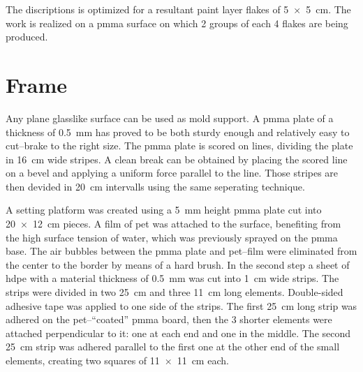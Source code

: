 \documentclass[review]{elsarticle}
\begin{document}
The discriptions is optimized for a resultant paint layer flakes of \SI[product-units = single]{5 x 5}{\cm}. The work is realized on a \gls{pmma} surface on which 2 groups of each 4 flakes are being produced.

\section{Frame}

Any plane glasslike surface can be used as mold support.
A \gls{pmma} plate of a thickness of \SI{0.5}{\mm} has proved to be both sturdy enough and relatively easy to cut--brake to the right size.
The \gls{pmma} plate is scored on lines, dividing the plate in \SI{16}{\cm} wide stripes.
A clean break can be obtained by placing the scored line on a bevel and applying a uniform force parallel to the line.
Those stripes are then devided in \SI{20}{\cm} intervalls using the same seperating technique.

A setting platform was created using a \SI{5}{\mm} height \gls{pmma} plate cut into \SI[product-units = single]{20 x 12}{\cm} pieces.
A film of \gls{pet} was attached to the surface, benefiting from the high surface tension of water, which was previously sprayed on the \gls{pmma} base.
The air bubbles between the \gls{pmma} plate and \gls{pet}--film were eliminated from the center to the border by means of a hard brush.
In the second step a sheet of \gls{hdpe} with a material thickness of \SI{0.5}{\mm} was cut into \SI{1}{\cm} wide strips. The strips were divided in two \SI{25}{\cm} and three \SI{11}{\cm} long elements.
Double-sided adhesive tape was applied to one side of the strips.
The first \SI{25}{\cm} long strip was adhered on the \gls{pet}--“coated” \gls{pmma} board, then the 3 shorter elements were attached perpendicular to it: one at each end and one in the middle.
The second \SI{25}{\cm} strip was adhered parallel to the first one at the other end of the small elements, creating two squares of \SI[product-units = single]{11 x 11}{\cm} each.
\end{document}
